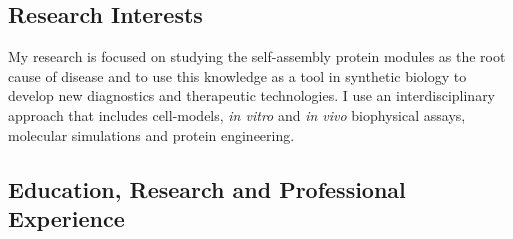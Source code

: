 \documentclass[letterpaper,11pt]{article}
\begin{document}
\vspace{0.2cm}

\subsection*{Research Interests}

My research is focused on studying the self-assembly protein modules as the root cause of disease and to use this knowledge as a tool in synthetic biology to develop new diagnostics and therapeutic technologies. I use an interdisciplinary approach that includes cell-models, \textit{in vitro} and \textit{in vivo} biophysical assays, molecular simulations and protein engineering.


\subsection*{Education, Research and Professional Experience}
\end{document}

